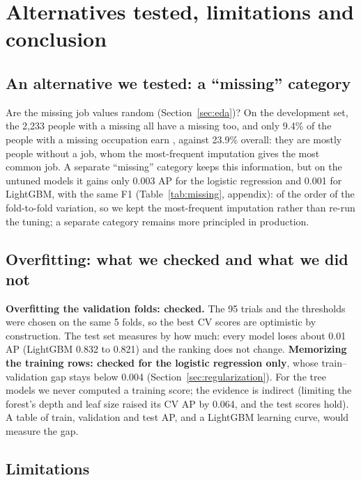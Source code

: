 \section{Alternatives tested, limitations and conclusion}
\label{sec:discussion}

\subsection{An alternative we tested: a ``missing'' category}

Are the missing job values random (Section~\ref{sec:eda})? On the development
set, the 2{,}233 people with a missing  all have a missing
 too, and only 9.4\% of the people with a missing occupation
earn \pos, against 23.9\% overall: they are mostly people without a job, whom
the most-frequent imputation gives the most common job. A separate ``missing''
category keeps this information, but on the untuned models it gains only 0.003
AP for the logistic regression and 0.001 for LightGBM, with the same F1
(Table~\ref{tab:missing}, appendix): of the order of the fold-to-fold
variation, so we kept the most-frequent imputation rather than re-run the
tuning; a separate category remains more principled in production.

\subsection{Overfitting: what we checked and what we did not}
\label{sec:overfitting}

\textbf{Overfitting the validation folds: checked.} The 95 trials and the
thresholds were chosen on the same 5 folds, so the best CV scores are
optimistic by construction. The test set measures by how much: every model
loses about 0.01 AP (LightGBM 0.832 to 0.821) and the ranking does not change.
\textbf{Memorizing the training rows: checked for the logistic regression
only}, whose train--validation gap stays below 0.004
(Section~\ref{sec:regularization}). For the tree models we never computed a
training score; the evidence is indirect (limiting the forest's depth and leaf
size raised its CV AP by 0.064, and the test scores hold). A table of train,
validation and test AP, and a LightGBM learning curve, would measure the gap.

\subsection{Limitations}

